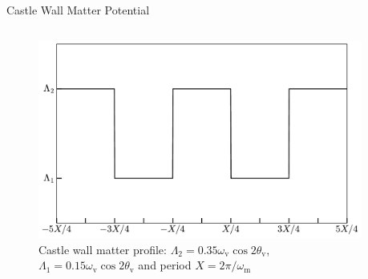 \documentclass[9pt]{beamer}
\begin{document}
\begin{darkframes}
\begin{frame}{Castle Wall Matter Potential}
\begin{columns}[T]
\begin{column}{0.5\textwidth}
{\begin{figure}
    \centering
    \includegraphics[width=\columnwidth]{assets/castlewall-profile}
    \caption*{Castle wall matter profile: $\Lambda_2 =0.35\omega_{\mathrm v} \cos 2\theta_{\mathrm v} $,  $\Lambda_1 = 0.15\omega_{\mathrm v} \cos 2\theta_{\mathrm v}$ and period $X =2\pi/\omega_{\mathrm m}$ }
\end{figure}

}



\end{column}%
\begin{column}{0.5\textwidth}



\end{column}
\end{columns}
\end{frame}
\end{darkframes}
\end{document}
